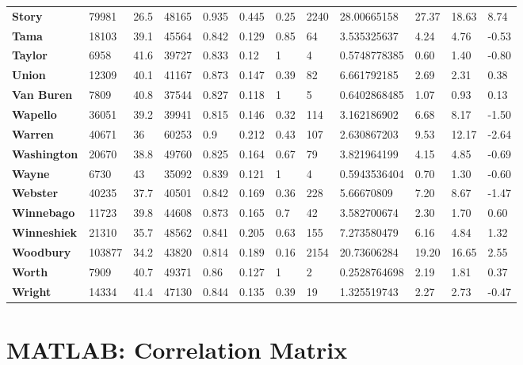 \documentclass[11pt]{article}
\begin{document}
\begin{table}[H]
\begin{tabular}{llllllllllll}
\textbf{Story} & 79981 & 26.5 & 48165 & 0.935 & 0.445 & 0.25 & 2240 & 28.00665158 & 27.37 & 18.63 & 8.74 \\
\textbf{Tama} & 18103 & 39.1 & 45564 & 0.842 & 0.129 & 0.85 & 64 & 3.535325637 & 4.24 & 4.76 & -0.53 \\
\textbf{Taylor} & 6958 & 41.6 & 39727 & 0.833 & 0.12 & 1 & 4 & 0.5748778385 & 0.60 & 1.40 & -0.80 \\
\textbf{Union} & 12309 & 40.1 & 41167 & 0.873 & 0.147 & 0.39 & 82 & 6.661792185 & 2.69 & 2.31 & 0.38 \\
\textbf{Van Buren} & 7809 & 40.8 & 37544 & 0.827 & 0.118 & 1 & 5 & 0.6402868485 & 1.07 & 0.93 & 0.13 \\
\textbf{Wapello} & 36051 & 39.2 & 39941 & 0.815 & 0.146 & 0.32 & 114 & 3.162186902 & 6.68 & 8.17 & -1.50 \\
\textbf{Warren} & 40671 & 36 & 60253 & 0.9 & 0.212 & 0.43 & 107 & 2.630867203 & 9.53 & 12.17 & -2.64 \\
\textbf{Washington} & 20670 & 38.8 & 49760 & 0.825 & 0.164 & 0.67 & 79 & 3.821964199 & 4.15 & 4.85 & -0.69 \\
\textbf{Wayne} & 6730 & 43 & 35092 & 0.839 & 0.121 & 1 & 4 & 0.5943536404 & 0.70 & 1.30 & -0.60 \\
\textbf{Webster} & 40235 & 37.7 & 40501 & 0.842 & 0.169 & 0.36 & 228 & 5.66670809 & 7.20 & 8.67 & -1.47 \\
\textbf{Winnebago} & 11723 & 39.8 & 44608 & 0.873 & 0.165 & 0.7 & 42 & 3.582700674 & 2.30 & 1.70 & 0.60 \\
\textbf{Winneshiek} & 21310 & 35.7 & 48562 & 0.841 & 0.205 & 0.63 & 155 & 7.273580479 & 6.16 & 4.84 & 1.32 \\
\textbf{Woodbury} & 103877 & 34.2 & 43820 & 0.814 & 0.189 & 0.16 & 2154 & 20.73606284 & 19.20 & 16.65 & 2.55 \\
\textbf{Worth} & 7909 & 40.7 & 49371 & 0.86 & 0.127 & 1 & 2 & 0.2528764698 & 2.19 & 1.81 & 0.37 \\
\textbf{Wright} & 14334 & 41.4 & 47130 & 0.844 & 0.135 & 0.39 & 19 & 1.325519743 & 2.27 & 2.73 & -0.47
\end{tabular}
\end{table}
\restoregeometry
\newpage

\section{MATLAB: Correlation Matrix}

\newpage
\end{document}
